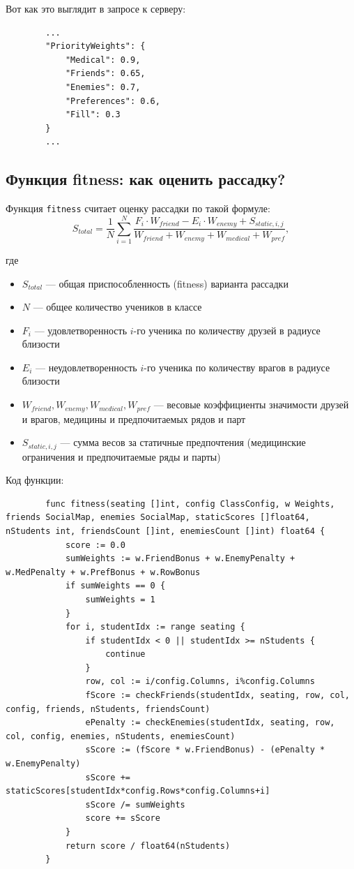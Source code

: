 \documentclass[12pt,a4paper]{extarticle} %
\begin{document}
	Вот как это выглядит в запросе к серверу:
	\begin{verbatim}
		...
		"PriorityWeights": {
			"Medical": 0.9,
			"Friends": 0.65,
			"Enemies": 0.7,
			"Preferences": 0.6,
			"Fill": 0.3
		}
		...
	\end{verbatim}
	
	\subsection{Функция fitness: как оценить рассадку?}
	Функция \texttt{fitness} считает оценку рассадки по такой формуле:
	\begin{equation}
		S_{total} = \frac{1}{N} \sum_{i=1}^{N} \frac{F_i \cdot W_{friend} - E_i \cdot W_{enemy} + S_{static, i, j}}{W_{friend} + W_{enemy} + W_{medical} + W_{pref}},
	\end{equation}
	
	где 
	\begin{itemize}
		\item $S_{total}$ --- общая приспособленность (fitness) варианта рассадки
		\item $N$ --- общее количество учеников в классе
		\item $F_i$ --- удовлетворенность $i$-го ученика по количеству друзей в радиусе близости
		\item $E_i$ --- неудовлетворенность $i$-го ученика по количеству врагов в радиусе близости
		\item $W_{friend}, W_{enemy}, W_{medical}, W_{pref}$ --- весовые коэффициенты значимости друзей и врагов, медицины и предпочитаемых рядов и парт
		\item $S_{static, i, j}$ --- сумма весов за статичные предпочтения (медицинские ограничения и предпочитаемые ряды и парты)
	\end{itemize}
	
	Код функции:
	
	\begin{verbatim}
		func fitness(seating []int, config ClassConfig, w Weights, friends SocialMap, enemies SocialMap, staticScores []float64, nStudents int, friendsCount []int, enemiesCount []int) float64 {
			score := 0.0
			sumWeights := w.FriendBonus + w.EnemyPenalty + w.MedPenalty + w.PrefBonus + w.RowBonus
			if sumWeights == 0 {
				sumWeights = 1
			}
			for i, studentIdx := range seating {
				if studentIdx < 0 || studentIdx >= nStudents {
					continue
				}
				row, col := i/config.Columns, i%config.Columns
				fScore := checkFriends(studentIdx, seating, row, col, config, friends, nStudents, friendsCount)
				ePenalty := checkEnemies(studentIdx, seating, row, col, config, enemies, nStudents, enemiesCount)
				sScore := (fScore * w.FriendBonus) - (ePenalty * w.EnemyPenalty)
				sScore += staticScores[studentIdx*config.Rows*config.Columns+i]
				sScore /= sumWeights
				score += sScore
			}
			return score / float64(nStudents)
		}
	\end{verbatim}
	
\end{document}
